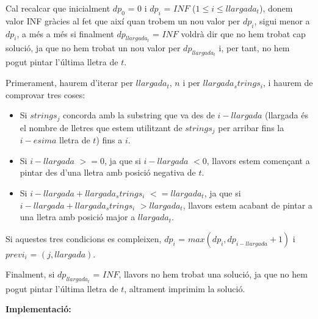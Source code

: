 Cal recalcar que inicialment $dp_{0}$ = $0$ i $dp_{i}$ = $INF$ ($1 \leq i \leq llargada_t$), donem valor INF gràcies al fet que així quan trobem un nou valor per $dp_{i}$, sigui menor a $dp_{i}$, a més a més si finalment $dp_{llargada_t}$ = $INF$ voldrà dir que no hem trobat cap solució, ja que no hem trobat un nou valor per $dp_{llargada_t}$ i, per tant, no hem pogut pintar l'última lletra de $t$. \newlines

Primerament, haurem d'iterar per $llargada_t$, $n$ i per $llargada_strings_{i}$, i haurem de comprovar tres coses:

\begin{itemize}
\item Si $strings_{j}$ concorda amb la substring que va des de $i - llargada$ (llargada és el nombre de lletres que estem utilitzant de $strings_{j}$ per arribar fins la $i-esima$ lletra de $t$) fins a $i$.

\item Si $i - llargada$ $>= 0$, ja que si $i - llargada$ $< 0$, llavors estem començant a pintar des d'una lletra amb posició negativa de $t$.

\item Si $i - llargada + llargada_strings_{i}$ $<= llargada_t$, ja que si $i - llargada + llargada_strings_{i}$ $> llargada_t$, llavors estem acabant de pintar a una lletra amb posició major a $llargada_t$.
\end{itemize}

Si aquestes tres condicions es compleixen, $dp_{i}$ = $max(dp_{i}, dp_{i - llargada} + 1)$ i $previ_{i}$ = $(j, llargada)$.

Finalment, si $dp_{llargada_t}$ = $INF$, llavors no hem trobat una solució, ja que no hem pogut pintar l'última lletra de $t$, altrament imprimim la solució. \newline

\textbf{Implementació:} \newline

